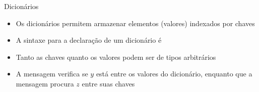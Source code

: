 \begin{frame}[fragile]{Dicionários}

    \begin{itemize}
        \item Os dicionários permitem armazenar elementos (valores) indexados por
            chaves

        \item A sintaxe para a declaração de um dicionário é


        \item Tanto as chaves quanto os valores podem ser de tipos arbitrários


        \item A mensagem  verifica se $y$ está entre os
            valores do dicionário, enquanto que a mensagem 
            procura $z$ entre suas chaves

    \end{itemize}

\end{frame}
